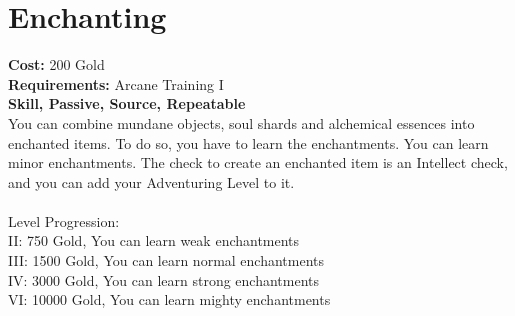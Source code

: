 \section{Enchanting}
\textbf{Cost:} 200 Gold\\
\textbf{Requirements:} Arcane Training I\\
\textbf{Skill, Passive, Source, Repeatable}\\
You can combine mundane objects, soul shards and alchemical essences into enchanted items. To do so, you have to learn the enchantments. You can learn minor enchantments. The check to create an enchanted item is an Intellect check, and you can add your Adventuring Level to it.\\
\\
Level Progression:\\
II: 750 Gold, You can learn weak enchantments\\
III: 1500 Gold, You can learn normal enchantments\\
IV: 3000 Gold, You can learn strong enchantments\\
VI: 10000 Gold, You can learn mighty enchantments\\